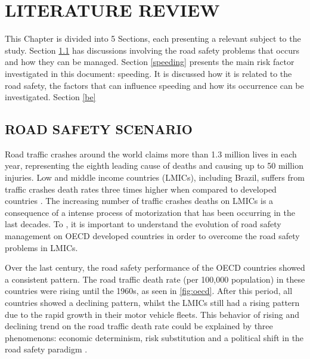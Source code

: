 

\chapter{LITERATURE REVIEW}

This Chapter is divided into 5 Sections, each presenting a relevant subject to the study. Section \ref{sec:rss} has discussions involving the road safety problems that occurs and how they can be managed. Section \ref{speeding} presents the main risk factor investigated in this document: speeding. It is discussed how it is related to the road safety, the factors that can influence speeding and how its occurrence can be investigated. Section \ref{be} 

\section{ROAD SAFETY SCENARIO} \label{sec:rss}

Road traffic crashes around the world claims more than 1.3 million lives in each year, representing the eighth leading cause of deaths and causing up to 50 million injuries. Low and middle income countries (LMICs), including Brazil, suffers from traffic crashes death rates three times higher when compared to developed countries \cite{WHO2018}. The increasing number of traffic crashes deaths on LMICs is a consequence of a intense process of motorization that has been occurring in the last decades. To \textcite{Bhalla2016}, it is important to understand the evolution of road safety management on OECD developed countries in order to overcome the road safety problems in LMICs. 

Over the last century, the road safety performance of the OECD countries showed a consistent pattern. The road traffic death rate (per 100,000 population) in these countries were rising until the 1960s, as seen in \autoref{fig:oecd}. After this period, all countries showed a declining pattern, whilst the LMICs still had a rising pattern due to the rapid growth in their motor vehicle fleets. This behavior of rising and declining trend on the road traffic death rate could be explained by three phenomenons: economic determinism, risk substitution and a political shift in the road safety paradigm \cite{Bhalla2016}.

